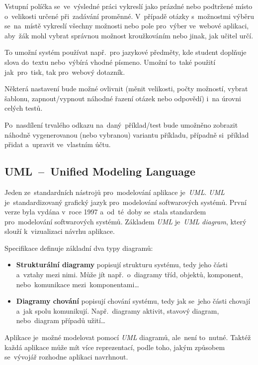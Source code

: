 \documentclass[10pt,a4paper]{article}
\begin{document}
            Vstupní políčka se~ve~výsledné práci vykreslí jako prázdné nebo podtržené místo o~velikosti určené při~zadávání proměnné. V~případě otázky s~možnostmi výběru se~na~místě vykreslí všechny možnosti nebo pole pro~výber ve~webové aplikaci, aby~žák mohl vybrat správnou možnost kroužkováním nebo jinak, jak učitel určí.
            
            To umožní systém používat např.~pro jazykové předměty, kde student doplňuje slova do~textu nebo~výbírá vhodné písmeno. Umožní to~také použití jak~pro~tisk, tak pro~webový dotazník.

            Některá nastavení bude možné ovlivnit (měnit velikosti, počty možností, vybrat šablonu, zapnout/vypnout náhodné řazení otázek nebo odpovědí) i~na úrovni celých testů.

            Po~nasdílení trvalého odkazu na~daný~příklad/test bude umožněno zobrazit náhodně vygenerovanou (nebo vybranou) variantu příkladu, případně si~příklad přidat a~upravit ve~vlastním účtu.

        \subsection{UML~--~Unified Modeling Language}
            Jeden ze~standardních nástrojů pro~modelování aplikace je~\emph{UML}. \emph{UML} je~standardizovaný grafický jazyk pro~modelování softwarových systémů. První verze byla vydána v~roce 1997 a~od~té~doby se~stala standardem pro~modelování softwarových systémů. Základem \emph{UML} je~\emph{UML diagram}, který slouží k~vizualizaci návrhu aplikace.
            
            Specifikace definuje základní dva typy diagramů:
            \begin{itemize}
                \item \textbf{Strukturální diagramy} popisují strukturu systému, tedy jeho části a~vztahy mezi nimi. Může jít např.~o~diagramy tříd, objektů, komponent, nebo~komunikace mezi~komponentami\dots
                \item \textbf{Diagramy chování} popisují chování systému, tedy jak se~jeho části chovají a~jak spolu komunikují. Např.~diagramy aktivit, stavový diagram, nebo~diagram případů užití\dots
            \end{itemize}

            Aplikace je~možné modelovat pomocí \emph{UML} diagramů, ale~není to~nutné. Taktéž každá aplikace může mít více reprezentací, podle toho, jakým způsobem se~vývojář rozhodne aplikaci navrhnout. \cite{uml:diagram}
\end{document}
